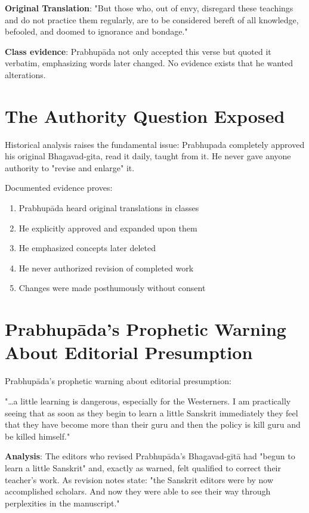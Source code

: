\documentclass[11pt,twoside]{book}
\begin{document}
\textbf{\textbf{Original Translation}}: "But those who, out of envy, disregard these teachings and do not practice them regularly, are to be considered bereft of all knowledge, befooled, and doomed to ignorance and bondage."

\textbf{\textbf{Class evidence}}: Prabhupāda not only accepted this verse but quoted it verbatim, emphasizing words later changed. No evidence exists that he wanted alterations.
\section*{The Authority Question Exposed}
\label{sec:orgbfe525d}

Historical analysis raises the fundamental issue: Prabhupada completely approved his original Bhagavad-gita, read it daily, taught from it. He never gave anyone authority to "revise and enlarge" it.

Documented evidence proves:
\begin{enumerate}
\item Prabhupāda heard original translations in classes
\item He explicitly approved and expanded upon them
\item He emphasized concepts later deleted
\item He never authorized revision of completed work
\item Changes were made posthumously without consent
\end{enumerate}
\section*{Prabhupāda's Prophetic Warning About Editorial Presumption}
\label{sec:org646cd23}

Prabhupāda's prophetic warning about editorial presumption:

"\ldots{}a little learning is dangerous, especially for the Westerners. I am practically seeing that as soon as they begin to learn a little Sanskrit immediately they feel that they have become more than their guru and then the policy is kill guru and be killed himself."

\textbf{\textbf{Analysis}}: The editors who revised Prabhupāda's Bhagavad-gītā had "begun to learn a little Sanskrit" and, exactly as warned, felt qualified to correct their teacher's work. As revision notes state: "the Sanskrit editors were by now accomplished scholars. And now they were able to see their way through perplexities in the manuscript."
\end{document}
